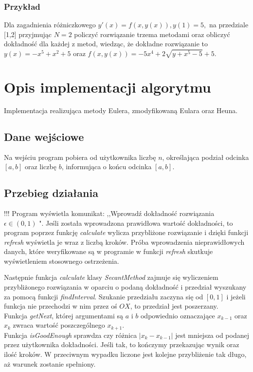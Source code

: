 \documentclass[12pt]{article}
\begin{document}
\subsubsection{Przykład}
Dla zagadnienia różniczkowego $y'(x)= f(x,y(x)), y(1)=5,$  na przedziale [1,2] przyjmując $N = 2$ policzyć rozwiązanie trzema metodami oraz obliczyć dokładność dla każdej z metod, wiedząc, że dokładne rozwiązanie to\\ $y(x)=-x^5+x^2+5$ oraz         $f(x,y(x))=-5x^4+2 \sqrt{y+x^5-5}+5.$


\section{Opis implementacji algorytmu}
Implementacja realizująca metody Eulera, zmodyfikowaną Eulara oraz Heuna.
\subsection{Dane wejściowe}
Na wejściu program pobiera od użytkownika liczbę $n$, określająca podział odcinka $[a, b]$ oraz liczbę $b$, informująca o końcu odcinka $[a, b]$.



\subsection{Przebieg działania}
!!!
Program wyświetla komunikat: ,,Wprowadź dokładność rozwiązania $\epsilon \in(0,1)$ ". Jeśli została wprowadzona prawidłowa wartość dokładności, to program poprzez funkcję \emph{calculate} wylicza przybliżone rozwiązanie i dzięki funkcji \emph{refresh} wyświetla je wraz z liczbą kroków.
Próba wprowadzenia nieprawidłowych danych, które weryfikowane są w programie w funkcji \emph{refresh} skutkuje wyświetleniem stosownego ostrzeżenia.
\par Następnie funkcja \emph{calculate} klasy \emph{SecantMethod} zajmuje się wyliczeniem przybliżonego rozwiązania w oparciu o podaną dokładność i przedział wyszukany za pomocą funkcji \emph{findInterval}. Szukanie przedziału zaczyna się od $[0, 1]$ i jeżeli funkcja nie przechodzi w nim przez oś $OX$, to przedział jest poszerzany.\\
Funkcja \emph{getNext}, której argumentami są $a$ i $b$ odpowiednio oznaczające $x_{k-1}$ oraz $x_{k}$ zwraca wartość poszczególnego $x_{k+1}$.
\\
Funkcja \emph{isGoodEnough} sprawdza czy różnica  $|x_k - x_{k-1}|$ jest mniejsza od podanej przez użytkownika dokładności. Jeśli tak, to kończymy przekazując wynik oraz ilość kroków. W przeciwnym wypadku liczone jest kolejne przybliżenie tak długo, aż warunek zostanie spełniony.
\end{document}
